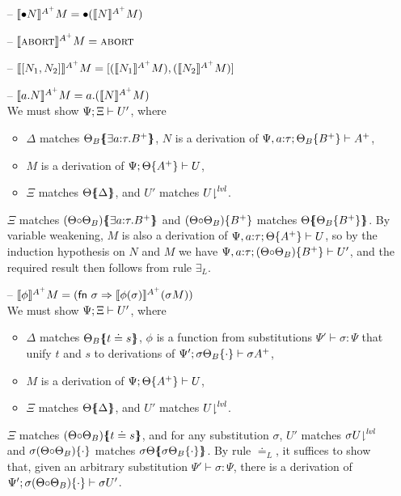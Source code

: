 \begin{itemize}
\item[--] $\lsubsta{\tfusel{N}}{M}{A^+} = \tfusel{(\lsubsta{N}{M}{A^+})}$
\item[--] $\lsubsta{\tabort}{M}{A^+} = \tabort$
\item[--] $\lsubsta{\toplusl{N_1}{N_2}}{M}{A^+} = \toplusl{(\lsubsta{N_1}{M}{A^+})}{(\lsubsta{N_2}{M}{A^+})}$
\item[--] $\lsubsta{\texistsl{a}{N}}{M}{A^+} = \texistsl{a}{(\lsubsta{N}{M}{A^+})}$\smallskip\\
  We must show $\foc{\Psi}{\Xi}{U'}$, where
  \begin{itemize}
  \item $\Delta$ matches $\frameoff{\Theta_B}{\exists a{:}\tau.B^+}$, 
     $N$ is a derivation of $\foc{\Psi,a{:}\tau}{\tackon{\Theta_B}{B^+}}{A^+}$,
  \item $M$ is a derivation of $\foc{\Psi}{\tackon{\Theta}{A^+}}{U}$,
  \item $\Xi$ matches $\frameoff{\Theta}{\Delta}$, and $U'$ matches 
     $\restrictfrom{U}{\mlvl}$.
  \end{itemize}
  $\Xi$ matches $\frameoff{(\Theta{\circ}\Theta_B)}{\exists a{:}\tau.B^+}$
  and $\tackon{(\Theta{\circ}\Theta_B)}{B^+}$ matches 
  $\frameoff{\Theta}{\tackon{\Theta_B}{B^+}}$. By variable weakening,
  $M$ is also a derivation of $\foc{\Psi, a{:}\tau}{\tackon{\Theta}{A^+}}{U}$,
  so by the induction hypothesis on $N$ and $M$ we have
  $\foc{\Psi, a{:}\tau}{\tackon{(\Theta{\circ}\Theta_B)}{B^+}}{U'}$, 
  and the required result then follows from rule $\exists_L$. \smallskip

\item[--] $\lsubsta{\phi}{M}{A^+} 
           = (\mathsf{fn}~\sigma \Rightarrow \lsubsta{\phi(\sigma)}{(\sigma{M})}{A^+})$\smallskip\\
  We must show $\foc{\Psi}{\Xi}{U'}$, where
  \begin{itemize}
  \item $\Delta$ matches $\frameoff{\Theta_B}{t \doteq s}$,
    $\phi$ is a function from substitutions $\Psi' \vdash \sigma : \Psi$
    that unify $t$ and $s$ to derivations of 
    $\foc{\Psi'}{\tackon{\sigma{\Theta_B}}{\cdot}}{\sigma{A^+}}$,
  \item $M$ is a derivation of $\foc{\Psi}{\tackon{\Theta}{A^+}}{U}$,
  \item $\Xi$ matches $\frameoff{\Theta}{\Delta}$, and $U'$ matches 
     $\restrictfrom{U}{\mlvl}$.
  \end{itemize}
  $\Xi$ matches $\frameoff{(\Theta{\circ}\Theta_B)}{t \doteq s}$, and 
  for any substitution $\sigma$, $U'$ matches 
  $\restrictfrom{\sigma{U}}{\mlvl}$ and
  $\tackon{\sigma(\Theta{\circ}\Theta_B)}{\cdot}$ matches 
  $\frameoff{\sigma\Theta}{\tackon{\sigma\Theta_B}{\cdot}}$.
  By rule $\doteq_L$, it suffices to show that, 
  given an arbitrary substitution $\Psi' \vdash \sigma : \Psi$, 
  there is a derivation of 
  $\foc{\Psi'}{\tackon{\sigma(\Theta{\circ}\Theta_B)}{\cdot}}{\sigma{U'}}$.
  


\end{itemize}
